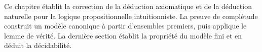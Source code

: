 \documentclass[../../../include/open-logic-chapter]{subfiles}
\begin{document}

Ce chapitre établit la correction de la déduction axiomatique et
de la déduction naturelle pour la logique propositionnelle
intuitionniste. La preuve de complétude construit un modèle
canonique à partir d'ensembles premiers, puis applique le lemme
de vérité. La dernière section établit la propriété du modèle
fini et en déduit la décidabilité.


\OLEndChapterHook
\end{document}
